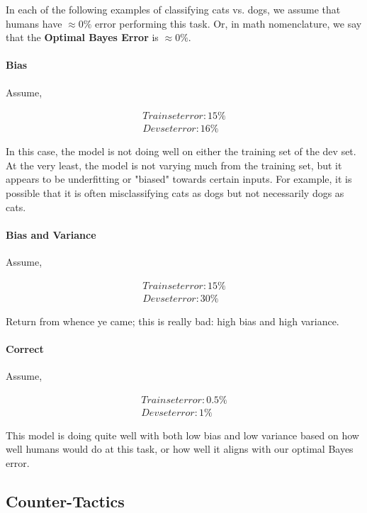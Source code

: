 \documentclass{article}
\begin{document}
In each of the following examples of classifying cats vs. dogs, we assume that humans have $\approx 0\%$ error performing this task.  Or, in math nomenclature, we say that the \textbf{Optimal Bayes Error} is $\approx 0\%$.

\paragraph{Bias}

Assume,

\begin{gather}
Train set error: 15\% \\
Dev set error: 16\%
\end{gather}

In this case, the model is not doing well on either the training set of the dev set.  At the very least, the model is not varying much from the training set, but it appears to be underfitting or "biased" towards certain inputs.  For example, it is possible that it is often misclassifying cats as dogs but not necessarily dogs as cats.

\paragraph{Bias and Variance}

Assume,

\begin{gather}
Train set error: 15\% \\
Dev set error: 30\%
\end{gather}

Return from whence ye came; this is really bad: high bias and high variance.

\paragraph{Correct}

Assume,

\begin{gather}
Train set error: 0.5\% \\
Dev set error: 1\%
\end{gather}

This model is doing quite well with both low bias and low variance based on how well humans would do at this task, or how well it aligns with our optimal Bayes error.

\subsection{Counter-Tactics}
\end{document}
